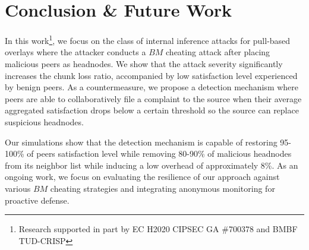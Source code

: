 \section{Conclusion \& Future Work}
\label{sec:conclusion}
In this work\footnote{Research supported in part by EC H2020 CIPSEC GA \#700378 and BMBF TUD-CRISP}, we focus on the class of internal inference attacks for pull-based overlays where the attacker conducts a $BM$ cheating attack after placing malicious peers as headnodes.
We show that the attack severity significantly increases the chunk loss ratio, accompanied by low satisfaction level experienced by benign peers.
As a countermeasure, we propose a detection mechanism where peers are able to collaboratively file a complaint to the source when their average aggregated satisfaction drops below a certain threshold so the source can replace suspicious headnodes.

Our simulations show that the detection mechanism is capable of restoring 95-100\% of peers satisfaction level while removing 80-90\% of malicious headnodes from its neighbor list while inducing a low overhead of approximately 8\%.
As an ongoing work, we focus on evaluating the resilience of our approach against various $BM$ cheating strategies and integrating anonymous monitoring for proactive defense.
